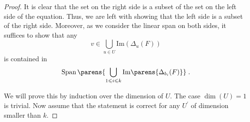 \begin{proof}
    It is clear that the set on the right side is a subset of the set on the left side of the equation.
    Thus, we are left with showing that the left side is a subset of the right side.
    Moreover, as we consider the linear span on both sides, it suffices to show that any
    \begin{equation*}
        v \in \bigcup_{u \in U} \mathrm{Im}(\Delta_u(F))
    \end{equation*}
    is contained in
    \begin{equation*}
        \SpanOp\parens{\bigcup_{1 \leqslant i \leqslant k} \mathrm{Im}\parens{\Delta_{b_i}(F)}}\;.
    \end{equation*}

    We will prove this by induction over the dimension of $U$.
    The case $\dim(U)=1$ is trivial.
    Now assume that the statement is correct for any $U^\prime$ of dimension smaller than $k$.


\end{proof}
